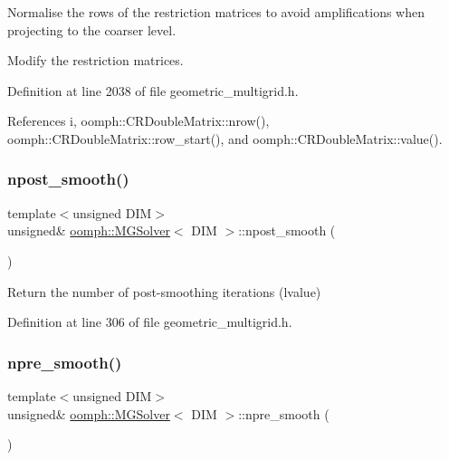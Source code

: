 Normalise the rows of the restriction matrices to avoid amplifications when projecting to the coarser level. 

Modify the restriction matrices. 

Definition at line 2038 of file geometric\+\_\+multigrid.\+h.



References i, oomph\+::\+C\+R\+Double\+Matrix\+::nrow(), oomph\+::\+C\+R\+Double\+Matrix\+::row\+\_\+start(), and oomph\+::\+C\+R\+Double\+Matrix\+::value().

\mbox{\label{classoomph_1_1MGSolver_a7ccbf719e57fb651fa4577c13b90942b}} 
\subsubsection{\texorpdfstring{npost\+\_\+smooth()}{npost\_smooth()}}
{\footnotesize\ttfamily template$<$unsigned D\+IM$>$ \\
unsigned\& \hyperlink{classoomph_1_1MGSolver}{oomph\+::\+M\+G\+Solver}$<$ D\+IM $>$\+::npost\+\_\+smooth (\begin{DoxyParamCaption}{ }\end{DoxyParamCaption})\hspace{0.3cm}{\ttfamily [inline]}}



Return the number of post-\/smoothing iterations (lvalue) 



Definition at line 306 of file geometric\+\_\+multigrid.\+h.

\mbox{\label{classoomph_1_1MGSolver_acfe72d9cc2743740a3e148e91919bf74}} 
\subsubsection{\texorpdfstring{npre\+\_\+smooth()}{npre\_smooth()}}
{\footnotesize\ttfamily template$<$unsigned D\+IM$>$ \\
unsigned\& \hyperlink{classoomph_1_1MGSolver}{oomph\+::\+M\+G\+Solver}$<$ D\+IM $>$\+::npre\+\_\+smooth (\begin{DoxyParamCaption}{ }\end{DoxyParamCaption})\hspace{0.3cm}{\ttfamily [inline]}}



